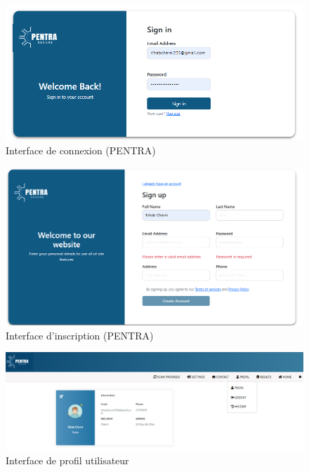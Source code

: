 \begin{justify}
\begin{enumerate}
        \begin{figure}[H]
            \centering
            \includegraphics[width=0.8\linewidth]{Annexe/PENTRA-V1/3.PNG}
            \caption{\centering Interface de connexion (PENTRA)}
            \label{fig:PENTRA-V1-3}
        \end{figure}
          \vspace{-0.3cm}
        \begin{figure}[H]
            \centering
            \includegraphics[width=0.8\linewidth]{Annexe/PENTRA-V1/2.PNG}
            \caption{\centering Interface d'inscription (PENTRA)}
            \label{fig:PENTRA-V1-2}
        \end{figure}
        \vspace{-0.3cm}
        \begin{figure}[H]
            \centering
            \includegraphics[width=0.8\linewidth]{Annexe/PENTRA-V1/13.PNG}
            \caption{\centering Interface de profil utilisateur}
            \label{fig:PENTRA-V1-11}
        \end{figure}
        \vspace{-0.3cm}

\end{enumerate}
\end{justify}
